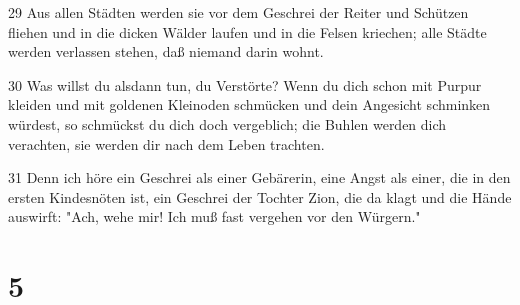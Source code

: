 \par 29 Aus allen Städten werden sie vor dem Geschrei der Reiter und Schützen fliehen und in die dicken Wälder laufen und in die Felsen kriechen; alle Städte werden verlassen stehen, daß niemand darin wohnt.
\par 30 Was willst du alsdann tun, du Verstörte? Wenn du dich schon mit Purpur kleiden und mit goldenen Kleinoden schmücken und dein Angesicht schminken würdest, so schmückst du dich doch vergeblich; die Buhlen werden dich verachten, sie werden dir nach dem Leben trachten.
\par 31 Denn ich höre ein Geschrei als einer Gebärerin, eine Angst als einer, die in den ersten Kindesnöten ist, ein Geschrei der Tochter Zion, die da klagt und die Hände auswirft: "Ach, wehe mir! Ich muß fast vergehen vor den Würgern."

\chapter{5}

